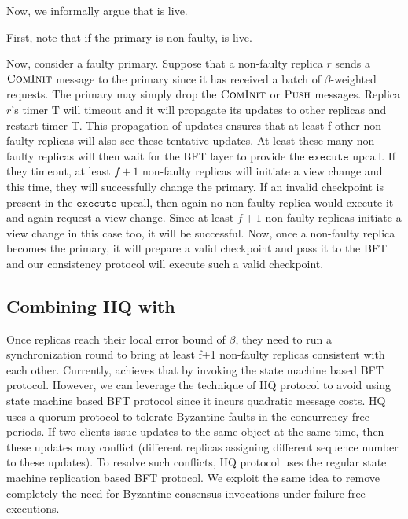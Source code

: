 \documentclass[twocolumn,10pt]{article}
\begin{document}
{Now, we informally argue that \Sys is live.

First, note that if the primary is non-faulty, \Sys is live. 

Now,  consider  a faulty  primary.  Suppose that a non-faulty replica $r$ sends a $\textsc{ComInit}$
message to the primary since it has received a batch of $\beta$-weighted requests. The primary
may simply  drop  the $\textsc{ComInit}$ or $\textsc{Push}$ 
messages. Replica $r$'s timer T will timeout and it will propagate its updates to
other replicas and restart timer T.  This propagation of updates ensures that at
least  f other non-faulty  replicas will  also see  these tentative  updates. At
least these many non-faulty replicas will  then wait for the BFT layer to provide the
$\mathtt{execute}$ upcall. If they timeout, at least $f+1$ non-faulty replicas will initiate a view
change  and this  time,  they will  successfully  change the  primary. If an invalid 
checkpoint is present in the $\mathtt{execute}$ upcall, then again no non-faulty
replica would execute it and again request a view change. Since at least $f+1$ 
non-faulty replicas initiate a view change in this case too, it will be successful.
Now, once a non-faulty replica becomes the primary, it will prepare a valid checkpoint 
and pass it to the BFT and our consistency protocol will execute such a valid checkpoint.

\subsection{Combining HQ with \Sys}
Once replicas reach their local error bound of $\beta$, they need to run a 
synchronization round to bring at least f+1 non-faulty replicas consistent with
each other. Currently, \Sys achieves that by invoking the state machine based BFT protocol. However,
we can leverage the technique of HQ protocol to avoid using state machine based BFT protocol
since it incurs quadratic message costs.
HQ uses a quorum protocol to tolerate Byzantine faults in the 
concurrency free periods. If two clients issue updates to the same object at the
same time, then these updates may conflict (different replicas assigning different
sequence number to these updates). To resolve such conflicts, HQ protocol uses the
regular state machine replication based BFT protocol. We exploit the same idea to
remove completely the need for Byzantine consensus invocations under failure
free executions.

}
\end{document}
